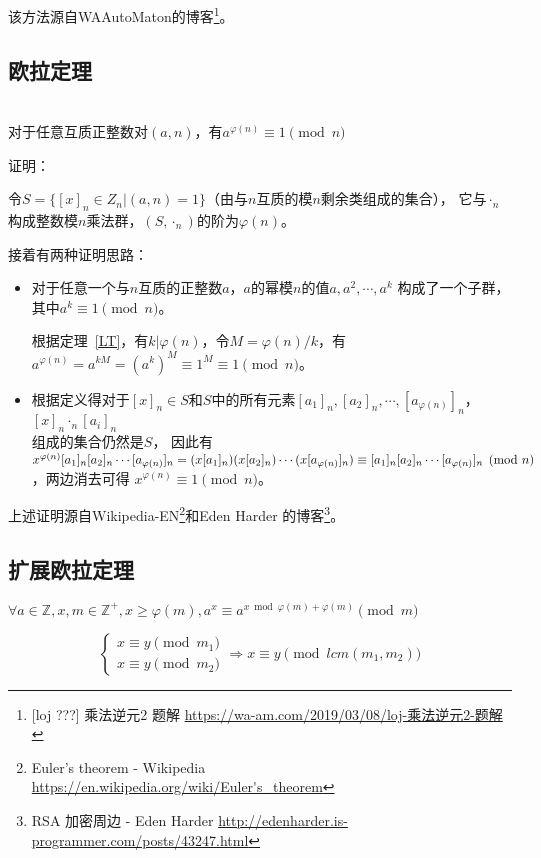 该方法源自WAAutoMaton的博客\footnote{
	[loj ???] 乘法逆元2 题解
	\url{https://wa-am.com/2019/03/08/loj-乘法逆元2-题解}
}。
\subsection{欧拉定理}
\begin{theorem}\label{ET}
	~\\
	对于任意互质正整数对$(a,n)$，有$a^{\varphi(n)} \equiv 1 \pmod{n}$
\end{theorem}
证明：

令$S=\{[x]_n\in Z_n|(a,n)=1\}$（由与$n$互质的模$n$剩余类组成的集合），
它与$\cdot_n$构成整数模$n$乘法群，$(S,\cdot_n)$的阶为$\varphi(n)$。

接着有两种证明思路：
\begin{itemize}
	\item 对于任意一个与$n$互质的正整数$a$，$a$的幂模$n$的值$a,a^2,\cdots,a^k$
	      构成了一个子群，其中$a^k\equiv 1 \pmod{n}$。

	      根据定理~\ref{LT}，有$k|\varphi(n)$，令$M=\varphi(n)/k$，有
	      $a^{\varphi(n)}=a^{kM}=(a^k)^M\equiv 1^M\equiv 1 \pmod{n}$。
	\item 根据定义得对于$[x]_n\in S$和$S$中的所有元素$[a_1]_n,[a_2]_n,\cdots,
		[a_{\varphi(n)}]_n$，$[x]_n \cdot_n [a_i]_n$\\组成的集合仍然是$S$，
		因此有$x^{\varphi(n)}[a_1]_n[a_2]_n\cdots[a_{\varphi(n)}]_n=
		(x[a_1]_n)(x[a_2]_n)\cdots\\(x[a_{\varphi(n)}]_n)\equiv[a_1]_n
		[a_2]_n\cdots[a_{\varphi(n)}]_n\pmod{n}$，两边消去可得
		$x^{\varphi(n)}\equiv 1\pmod{n}$。
\end{itemize}

上述证明源自Wikipedia-EN\footnote{Euler's theorem - Wikipedia
	\url{https://en.wikipedia.org/wiki/Euler's\_theorem}}和Eden Harder
的博客\footnote{RSA 加密周边 - Eden Harder
	\url{http://edenharder.is-programmer.com/posts/43247.html}}。
\subsection{扩展欧拉定理}
\begin{theorem}\label{exEuler}
	$\forall a\in \mathbb{Z},x,m\in \mathbb{Z^+},x\geq \varphi(m)
		,a^x\equiv a^{x \bmod \varphi(m)+\varphi(m)} \pmod{m}$
\end{theorem}

\begin{lemma}\label{EEL1}
	\begin{displaymath}
		\left\{
		\begin{array}{l}
			x\equiv y \pmod{m_1} \\
			x\equiv y \pmod{m_2}
		\end{array}
		\right.
		\Rightarrow x\equiv y \pmod{lcm(m_1,m_2)}
	\end{displaymath}
\end{lemma}

